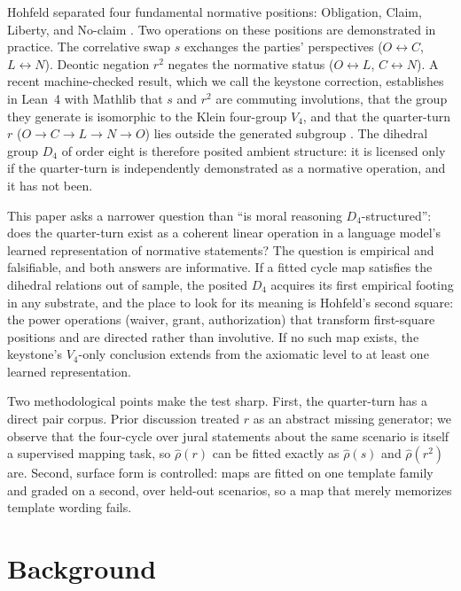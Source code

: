 \documentclass[11pt]{article}
\begin{document}
Hohfeld separated four fundamental normative positions: Obligation, Claim, Liberty, and
No-claim \cite{hohfeld1917}. Two operations on these positions are demonstrated in
practice. The correlative swap $s$ exchanges the parties' perspectives ($O \leftrightarrow
C$, $L \leftrightarrow N$). Deontic negation $r^2$ negates the normative status ($O
\leftrightarrow L$, $C \leftrightarrow N$). A recent machine-checked result, which we call
the keystone correction, establishes in Lean~4 with Mathlib that $s$ and $r^2$ are commuting
involutions, that the group they generate is isomorphic to the Klein four-group $V_4$, and
that the quarter-turn $r$ ($O \to C \to L \to N \to O$) lies outside the generated subgroup
\cite{hohfeldv4lean}. The dihedral group $D_4$ of order eight is therefore posited ambient
structure: it is licensed only if the quarter-turn is independently demonstrated as a
normative operation, and it has not been.

This paper asks a narrower question than ``is moral reasoning $D_4$-structured'': does the
quarter-turn exist as a coherent linear operation in a language model's learned
representation of normative statements? The question is empirical and falsifiable, and both
answers are informative. If a fitted cycle map satisfies the dihedral relations out of
sample, the posited $D_4$ acquires its first empirical footing in any substrate, and the
place to look for its meaning is Hohfeld's second square: the power operations (waiver,
grant, authorization) that transform first-square positions and are directed rather than
involutive. If no such map exists, the keystone's $V_4$-only conclusion extends from the
axiomatic level to at least one learned representation.

Two methodological points make the test sharp. First, the quarter-turn has a direct pair
corpus. Prior discussion treated $r$ as an abstract missing generator; we observe that the
four-cycle over jural statements about the same scenario is itself a supervised mapping
task, so $\hat\rho(r)$ can be fitted exactly as $\hat\rho(s)$ and $\hat\rho(r^2)$ are.
Second, surface form is controlled: maps are fitted on one template family and graded on a
second, over held-out scenarios, so a map that merely memorizes template wording fails.

\section{Background}
\end{document}
